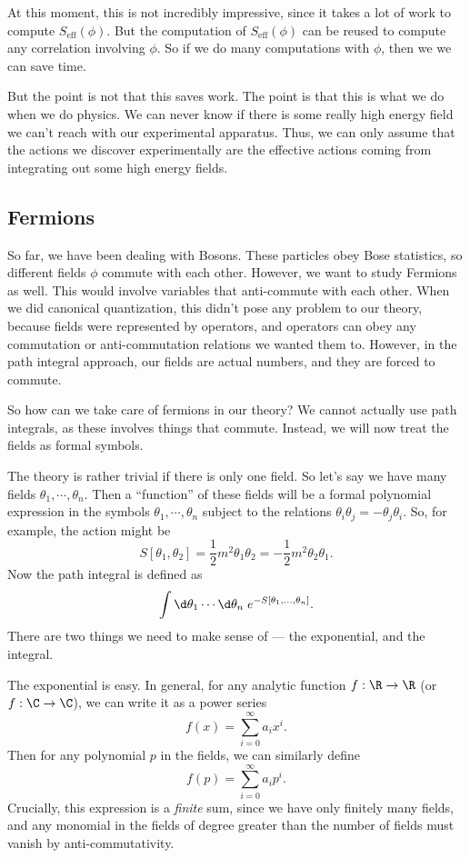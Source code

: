 \documentclass[a4paper]{article}
\begin{document}
At this moment, this is not incredibly impressive, since it takes a lot of work to compute $S_{\mathrm{eff}}(\phi)$. But the computation of $S_{\mathrm{eff}}(\phi)$ can be reused to compute any correlation involving $\phi$. So if we do many computations with $\phi$, then we we can save time.

But the point is not that this saves work. The point is that this is what we do when we do physics. We can never know if there is some really high energy field we can't reach with our experimental apparatus. Thus, we can only assume that the actions we discover experimentally are the effective actions coming from integrating out some high energy fields.

\subsection{Fermions}
So far, we have been dealing with Bosons. These particles obey Bose statistics, so different fields $\phi$ commute with each other. However, we want to study Fermions as well. This would involve variables that anti-commute with each other. When we did canonical quantization, this didn't pose any problem to our theory, because fields were represented by operators, and operators can obey any commutation or anti-commutation relations we wanted them to. However, in the path integral approach, our fields are actual numbers, and they are forced to commute.

So how can we take care of fermions in our theory? We cannot actually use path integrals, as these involves things that commute. Instead, we will now treat the fields as formal symbols.

The theory is rather trivial if there is only one field. So let's say we have many fields $\theta_1, \cdots, \theta_n$. Then a ``function'' of these fields will be a formal polynomial expression in the symbols $\theta_1, \cdots, \theta_n$ subject to the relations $\theta_i \theta_j = - \theta_j \theta_i$. So, for example, the action might be
\[
  S[\theta_1, \theta_2] = \frac{1}{2} m^2 \theta_1 \theta_2 = - \frac{1}{2}m^2 \theta_2 \theta_1.
\]
Now the path integral is defined as
\[
  \int \d \theta_1 \cdots \d \theta_n \; e^{-S[\theta_1, \ldots, \theta_n]}.
\]
There are two things we need to make sense of --- the exponential, and the integral.

The exponential is easy. In general, for any analytic function $f: \R \to \R$ (or $f: \C \to \C$), we can write it as a power series
\[
  f(x) = \sum_{i = 0}^\infty a_i x^i.
\]
Then for any polynomial $p$ in the fields, we can similarly define
\[
  f(p) = \sum_{i = 0}^\infty a_i p^i.
\]
Crucially, this expression is a \emph{finite} sum, since we have only finitely many fields, and any monomial in the fields of degree greater than the number of fields must vanish by anti-commutativity.
\end{document}
